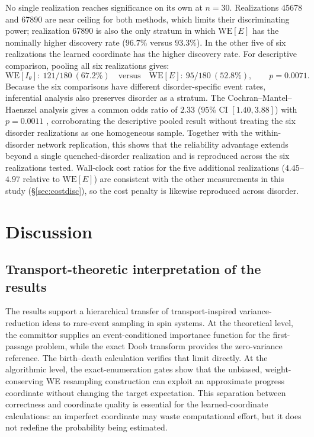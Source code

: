 \documentclass[a4paper,fleqn]{cas-sc}
\newcommand{\WE}{\mathrm{WE}}
\begin{document}
No single realization reaches significance on its own at $n=30$. Realizations 45678 and 67890
are near ceiling for both methods, which limits their discriminating power; realization 67890
is also the only stratum in which $\WE[E]$ has the nominally higher discovery rate ($96.7\%$
versus $93.3\%$). In the other five of six realizations the learned coordinate has the higher
discovery rate. For descriptive comparison, pooling all six realizations gives:
\begin{equation}
\WE[I_\theta]:\ 121/180\ (67.2\%) \quad\text{versus}\quad \WE[E]:\ 95/180\ (52.8\%),
\qquad p=0.0071.
\label{eq:disordergen}
\end{equation}
Because the six comparisons have different disorder-specific event rates, inferential analysis
also preserves disorder as a stratum. The Cochran--Mantel--Haenszel analysis gives a common odds
ratio of $2.33$ ($95\%$ CI $[1.40,3.88]$) with $p=0.0011$ \citep{mantel1959}, corroborating the
descriptive pooled result without treating the six disorder realizations as one homogeneous
sample. Together with the within-disorder network replication, this shows that the reliability
advantage extends beyond a single quenched-disorder realization and is reproduced across the
six realizations tested. Wall-clock cost ratios for the five additional realizations
($4.45$--$4.97$ relative to $\WE[E]$) are consistent with the other measurements in this study
(\S\ref{sec:costdisc}), so the cost penalty is likewise reproduced across disorder.

\FloatBarrier

\section{Discussion}\label{sec:discussion}

\subsection{Transport-theoretic interpretation of the results}\label{sec:established}
The results support a hierarchical transfer of transport-inspired variance-reduction ideas to
rare-event sampling in spin systems. At the theoretical level, the committor supplies an
event-conditioned importance function for the first-passage problem, while the exact Doob
transform provides the zero-variance reference. The birth--death calculation verifies that
limit directly. At the algorithmic level, the exact-enumeration gates show that the unbiased,
weight-conserving WE resampling construction can exploit an approximate progress coordinate
without changing the target expectation. This separation between correctness and coordinate
quality is essential for the learned-coordinate calculations: an imperfect coordinate may
waste computational effort, but it does not redefine the probability being estimated.
\end{document}
